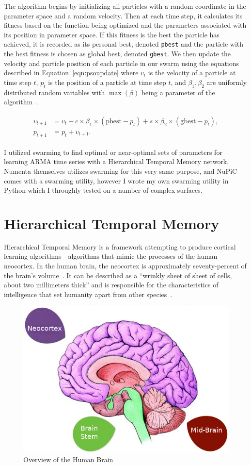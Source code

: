 \documentclass[oneside,12pt,openany]{book}
\begin{document}
	The algorithm begins by initializing all particles with a random coordinate in the parameter space and a random velocity. Then at each time step, it calculates its fitness based on the function being optimized and the parameters associated with its position in parameter space. If this fitness is the best the particle has achieved, it is recorded as its personal best, denoted \texttt{pbest} and the particle with the best fitness is chosen as global best, denoted \texttt{gbest}. We then update the velocity and particle position of each particle in our swarm using the equations described in Equation~\eqref{eqn:psoupdate} where $v_{t}$ is the velocity of a particle at time step $t$, $p_{t}$ is the position of a particle at time step $t$, and $\beta_{1}, \beta_{2}$ are uniformly distributed random variables with $\max(\beta)$ being a parameter of the algorithm~\cite{PSOReview}.
	
	\begin{align}
	\label{eqn:psoupdate}
	\begin{split}
	v_{t+1} &= v_{t}+c\times \beta_{1} \times (\text{pbest}-p_{t})+s\times \beta_{2} \times (\text{gbest}-p_{t}), \\
	p_{t+1} &= p_{t} + v_{t+1} .
	\end{split}
	\end{align}
	
	I utilized swarming to find optimal or near-optimal sets of parameters for learning ARMA time series with a Hierarchical Temporal Memory network. Numenta themselves utilizes swarming for this very same purpose, and NuPiC comes with a swarming utility, however I wrote my own swarming utility in Python which I throughly tested on a number of complex surfaces.
	
	\section{Hierarchical Temporal Memory}
	
	Hierarchical Temporal Memory is a framework attempting to produce cortical learning algorithms---algorithms that mimic the processes of the human neocortex. In the human brain, the neocortex is approximately seventy-percent of the brain's volume~\cite{DiscoveriesBrainWorks}. It can be described as a ``wrinkly sheet of sheet of cells, about two millimeters thick'' and is responsible for the characteristics of intelligence that set humanity apart from other species~\cite{DiscoveriesBrainWorks}. 
	
	\begin{figure}[!ht]
		\centering
		\includegraphics[width=.5\linewidth]{images/Brain.png}
		\caption{Overview of the Human Brain}
		\label{fig:brain}
	\end{figure}
	
\end{document}
